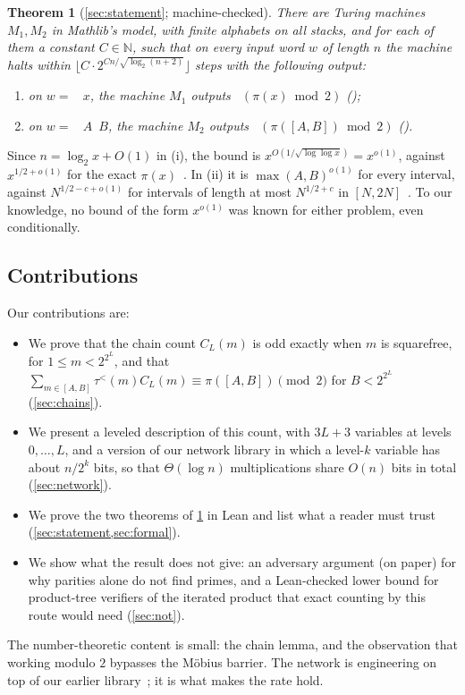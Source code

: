 \documentclass[10pt]{amsart}
\theoremstyle{plain}
\newtheorem{theorem}{Theorem}[section]
\theoremstyle{definition}
\theoremstyle{remark}
\numberwithin{equation}{section}
\newcommand{\N}{\mathbb{N}}
\newcommand{\tl}{\tau^{<}}
\begin{document}
\begin{theorem}[\cref{sec:statement}; machine-checked]\label{thm:main}
There are Turing machines $M_1,M_2$ in Mathlib's  model, with finite alphabets on all stacks,
and for each of them a constant $C\in\N$, such that on every input word $w$ of length $n$ the machine halts within
$\lfloor C\cdot2^{Cn/\sqrt{\log_2(n+2)}}\rfloor$ steps with the following output:
\begin{enumerate}[label=(\roman*)]
\item on $w=$ ~$x$, the machine $M_1$ outputs ~$(\pi(x)\bmod2)$
();
\item on $w=$ ~$A$~$B$, the machine $M_2$ outputs
~$(\pi([A,B])\bmod2)$ ().
\end{enumerate}
\end{theorem}

\noindent Since $n=\log_2x+O(1)$ in (i), the bound is $x^{O(1/\sqrt{\log\log x})}=x^{o(1)}$, against
$x^{1/2+o(1)}$ for the exact $\pi(x)$~\cite{LO87}. In (ii) it is $\max(A,B)^{o(1)}$ for every interval,
against $N^{1/2-c+o(1)}$ for intervals of length at most $N^{1/2+c}$ in $[N,2N]$~\cite{TCH12}. To our
knowledge, no bound of the form $x^{o(1)}$ was known for either problem, even conditionally.

\subsection{Contributions}
Our contributions are:
\begin{itemize}
\item We prove that the chain count $C_L(m)$ is odd exactly when $m$ is squarefree, for $1\le m<2^{2^L}$,
and that $\sum_{m\in[A,B]}\tl(m)C_L(m)\equiv\pi([A,B])\pmod2$ for $B<2^{2^L}$
(\cref{sec:chains}).
\item We present a leveled description of this count, with $3L+3$ variables at levels $0,\dots,L$, and a
version of our network library in which a level-$k$ variable has about $n/2^k$ bits, so that
$\Theta(\log n)$ multiplications share $O(n)$ bits in total (\cref{sec:network}).
\item We prove the two theorems of \cref{thm:main} in Lean and list what a reader must trust
(\cref{sec:statement,sec:formal}).
\item We show what the result does not give: an adversary argument (on paper) for why parities alone do
not find primes, and a Lean-checked lower bound for product-tree verifiers of the iterated product that
exact counting by this route would need (\cref{sec:not}).
\end{itemize}
The number-theoretic content is small: the chain lemma, and the observation that working modulo $2$
bypasses the M\"obius barrier. The network is engineering on top of our earlier library~\cite{TulCN26};
it is what makes the rate hold.
\end{document}
